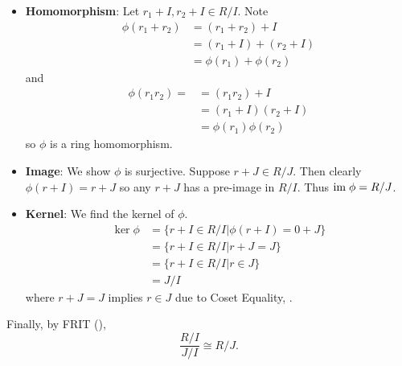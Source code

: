 \begin{questions}
\begin{partquestions}{\roman*}
\begin{itemize}
            \item \textbf{Homomorphism}: Let $r_1 + I, r_2 + I \in R/I$. Note
            \begin{align*}
                \phi(r_1+r_2) &= (r_1+r_2) + I\\
                &= (r_1+I) + (r_2+I)\\
                &= \phi(r_1) + \phi(r_2)
            \end{align*}
            and
            \begin{align*}
                \phi(r_1r_2) = &= (r_1r_2) + I\\
                &= (r_1+I)(r_2+I)\\
                &= \phi(r_1)\phi(r_2)
            \end{align*}
            so $\phi$ is a ring homomorphism.
    
            \item \textbf{Image}: We show $\phi$ is surjective. Suppose $r + J \in R/J$. Then clearly $\phi(r+I) = r+J$ so any $r+J$ has a pre-image in $R/I$. Thus $\mathrm{im}\;\phi = R/J$.
            
            \item \textbf{Kernel}: We find the kernel of $\phi$.
            \begin{align*}
                \ker\phi &= \{r+I \in R/I \vert \phi(r+I) = 0+J\}\\
                &= \{r+I \in R/I \vert r+J = J\}\\
                &= \{r+I \in R/I \vert r \in J\}\\
                &= J/I
            \end{align*}
            where $r+J=J$ implies $r \in J$ due to Coset Equality, .
        \end{itemize}
        Finally, by FRIT (),
        \[
            \frac{R/I}{J/I} \cong R/J.
        \]
    \end{partquestions}
\end{questions}

